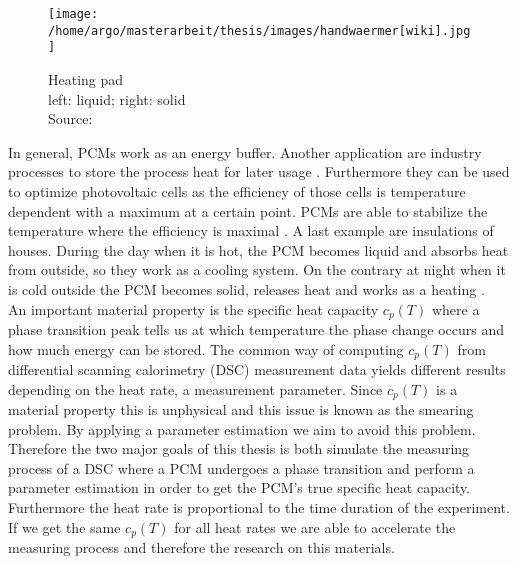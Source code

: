 \documentclass{scrartcl}[12pt, halfparskip]
\numberwithin{equation}{section}
\numberwithin{figure}{section}
\numberwithin{table}{section}
\begin{document}
\begin{wrapfigure}{l}{0.4\textwidth}
	\texttt{[image: /home/argo/masterarbeit/thesis/images/handwaermer[wiki].jpg]}
	\caption{Heating pad \\ left: liquid; right: solid \\
		Source: \cite{heating_pad_image}}
	\label{fig:heating_pad}
\end{wrapfigure}


In general, PCMs work as an energy buffer. Another application are industry processes to store the process heat for later usage \cite{pcm_process_heat}. Furthermore they can be used to optimize  photovoltaic cells as the efficiency of those cells is temperature dependent with a maximum at a certain point. PCMs are able to stabilize the temperature where the efficiency is maximal \cite{pcm_solar_cells}. 
A last example are insulations of houses. During the day when it is hot, the PCM becomes liquid and absorbs heat from outside, so they work as a cooling system. On the contrary at night when it is cold outside the PCM becomes solid, releases heat and works as a heating \cite{pcm_house_insulation}. \\
An important material property is the specific heat capacity $c_p(T)$ where a phase transition peak tells us at which temperature the phase change occurs and how much energy can be stored. The common way of computing $c_p(T)$ from differential scanning calorimetry (DSC) measurement data yields different results depending on the heat rate, a measurement parameter. Since $c_p(T)$ is a material property this is unphysical and this issue is known as the smearing problem. By applying a parameter estimation we aim to avoid this problem.
Therefore the two major goals of this thesis is both simulate the measuring process of a DSC where a PCM undergoes a phase transition and perform a parameter estimation in order to get the PCM's true specific heat capacity. 
Furthermore the heat rate is proportional to the time duration of the experiment. If we get the same $c_p(T)$ for all heat rates we are able to accelerate the measuring process and therefore the research on this materials. \\
\end{document}
